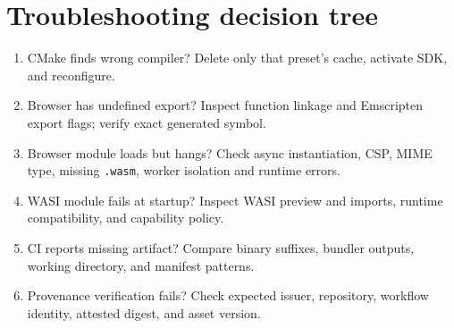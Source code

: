 \documentclass[11pt,letterpaper]{article}
\begin{document}
\section{Troubleshooting decision tree}
\begin{enumerate}
\item CMake finds wrong compiler? Delete only that preset's cache, activate SDK, and reconfigure.
\item Browser has undefined export? Inspect function linkage and Emscripten export flags; verify exact generated symbol.
\item Browser module loads but hangs? Check async instantiation, CSP, MIME type, missing \texttt{.wasm}, worker isolation and runtime errors.
\item WASI module fails at startup? Inspect WASI preview and imports, runtime compatibility, and capability policy.
\item CI reports missing artifact? Compare binary suffixes, bundler outputs, working directory, and manifest patterns.
\item Provenance verification fails? Check expected issuer, repository, workflow identity, attested digest, and asset version.
\end{enumerate}
\end{document}
